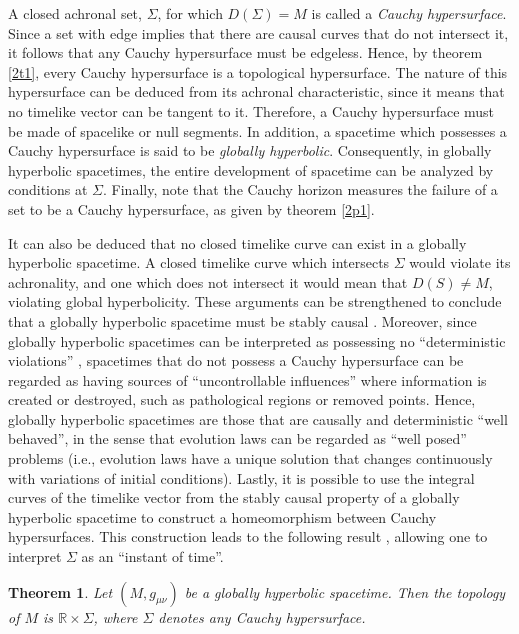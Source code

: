 \documentclass[
12pt,		%
openright,	%
twoside,  %
a4paper,			%
chapter=TITLE,		%
english,			%
french,				%
spanish,			%
brazil				%
]{USPSC-classe/USPSC}
\newtheorem{theorem}{Theorem}[section]
\begin{document}
A closed achronal set, $\Sigma$, for which $D(\Sigma)=M$ is called a \textit{Cauchy hypersurface}. Since a set with edge implies that there are causal curves that do not intersect it, it follows that any Cauchy hypersurface must be edgeless. Hence, by theorem \ref{2t1}, every Cauchy hypersurface is a topological hypersurface. The nature of this hypersurface can be deduced from its achronal characteristic, since it means that no timelike vector can be tangent to it. Therefore, a Cauchy hypersurface must be made of spacelike or null segments. In addition, a spacetime which possesses a Cauchy hypersurface is said to be \textit{globally hyperbolic}. Consequently, in globally hyperbolic spacetimes, the entire development of spacetime can be analyzed by conditions at $\Sigma$. Finally, note that the Cauchy horizon measures the failure of a set to be a Cauchy hypersurface, as given by theorem \ref{2p1}. 

It can also be deduced that no closed timelike curve can exist in a globally hyperbolic spacetime. A closed timelike curve which intersects $\Sigma$ would violate its achronality, and one which does not intersect it would mean that $D(S)\neq M$, violating global hyperbolicity. These arguments can be strengthened to conclude that a globally hyperbolic spacetime must be stably causal \cite{Wald1984}. Moreover, since globally hyperbolic spacetimes can be interpreted as possessing no “deterministic violations” \cite{Geroch1979}, spacetimes that do not possess a Cauchy hypersurface can be regarded as having sources of “uncontrollable influences” where information is created or destroyed, such as pathological regions or removed points.  Hence, globally hyperbolic spacetimes are those that are causally and deterministic ``well behaved'', in the sense that evolution laws can be regarded as ``well posed'' problems (i.e., evolution laws have a unique solution that changes continuously with variations of initial conditions). Lastly, it is possible to use the integral curves of the timelike vector from the stably causal property of a globally hyperbolic spacetime to construct a homeomorphism between Cauchy hypersurfaces. This construction leads to the following result \cite{Hawking1973}, allowing one to interpret $\Sigma$ as an “instant of time”. 
\begin{theorem}\label{timeins}
    Let $(M,g_{\mu\nu})$ be a globally hyperbolic spacetime. Then the topology of $M$ is $\mathbb{R}\times\Sigma$, where $\Sigma$ denotes any Cauchy hypersurface.
\end{theorem}
\end{document}
